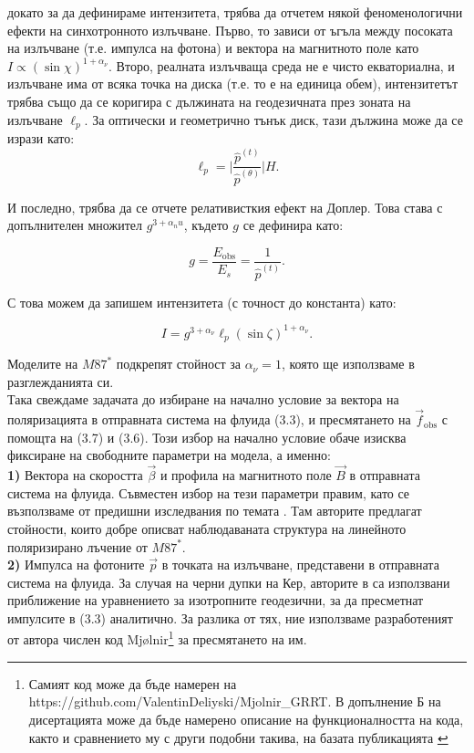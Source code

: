 \documentclass[12pt]{article}
\numberwithin{equation}{section}
\numberwithin{figure}{section}
\begin{document}
	\noindent докато за да дефинираме интензитета, трябва да отчетем някой феноменологични ефекти на синхотронното излъчване. Първо, то зависи от ъгъла между посоката на излъчване (т.е. импулса на фотона) и вектора на магнитното поле като $I\propto \left(\sin\chi\right)^{1+\alpha_\nu}$. Второ, реалната излъчваща среда не е чисто екваториална, и излъчване има от всяка точка на диска (т.е. то е на единица обем), интензитетът трябва също да се коригира с дължината на геодезичната през зоната на излъчване $\ell_p$. За оптически и геометрично тънък диск, тази дължина може да се изрази като:
	\begin{equation}
		\ell_p = \bigg\vert\frac{\hat{p}^{(t)}}{\hat{p}^{(\theta)}}\bigg\vert H.
	\end{equation}
	
	\noindent И последно, трябва да се отчете релативисткия ефект на Доплер. Това става с допълнителен множител $g^{3 + \alpha_nu}$, където $g$ се дефинира като:
	
	\begin{equation}
			g = \frac{E_\text{obs}}{E_s} = \frac{1}{\hat{p}^{(t)}}.
	\end{equation}
	
	\noindent С това можем да запишем интензитета (с точност до константа) като:
	
	\begin{equation}
		I = g^{3 + \alpha_\nu}\ell_p(\sin\zeta)^{1 + \alpha_\nu}.
	\end{equation}
	
	\noindent Моделите на $M87^*$ подкрепят стойност за $\alpha_\nu = 1$, която ще използваме в разглежданията си.\\
	
	Така свеждаме задачата до избиране на начално условие за вектора на поляризацията в отправната система на флуида (3.3), и пресмятането на $\vec{f}_\text{obs}$ с помощта на (3.7) и (3.6). Този избор на начално условие обаче изисква фиксиране на свободните параметри на модела, а именно:\\
	
	\textbf{1)} Вектора на скоростта $\vec{\beta}$ и профила на магнитното поле $\vec{B}$ в отправната система на флуида. Съвместен избор на тези параметри правим, като се възползваме от предишни изследвания по темата \cite{Narayan2021}. Там авторите предлагат стойности, които добре описват наблюдаваната структура на линейното поляризирано лъчение от $M87^*$.\\
	
	\textbf{2)} Импулса на фотоните $\vec{p}$ в точката на излъчване, представени в отправната система на флуида. За случая на черни дупки на Кер, авторите в \cite{Narayan2021} са използвани приближение на уравнението за изотропните геодезични, за да пресметнат импулсите в (3.3) аналитично. За разлика от тях, ние използваме разработеният от автора числен код Mjølnir\footnote{Самият код може да бъде намерен на https://github.com/ValentinDeliyski/Mjolnir\_GRRT. В допълнение Б на дисертацията може да бъде намерено описание на функционалността на кода, както и сравнението му с други подобни такива, на базата публикацията \cite{Gold2020}} за пресмятането на им.
	
\end{document}
